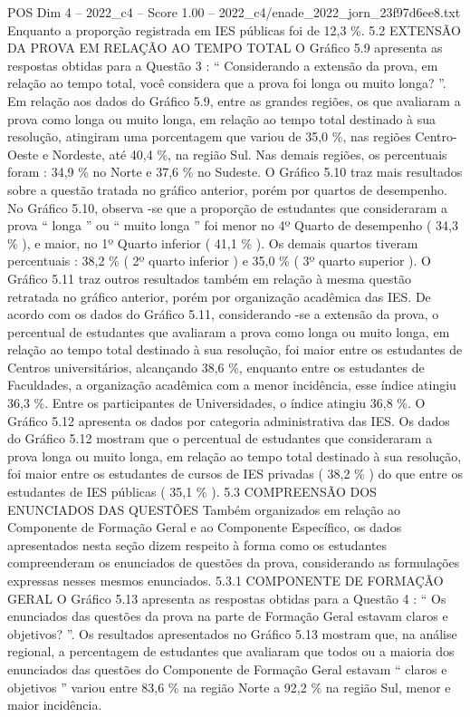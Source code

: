 \begin{textsample}{POS Dim 4 – 2022\_c4 – Score 1.00 – 2022\_c4/enade\_2022\_jorn\_23f97d6ee8.txt}
Enquanto a proporção registrada em IES públicas foi de 12,3 \%. 5.2 EXTENSÃO DA PROVA EM RELAÇÃO AO TEMPO TOTAL O Gráfico 5.9 apresenta as respostas obtidas para a Questão 3 : “ Considerando a extensão da prova, em relação ao tempo total, você considera que a prova foi longa ou muito longa? ”.
Em relação aos dados do Gráfico 5.9, entre as grandes regiões, os que avaliaram a prova como longa ou muito longa, em relação ao tempo total destinado à sua resolução, atingiram uma porcentagem que variou de 35,0 \%, nas regiões Centro-Oeste e Nordeste, até 40,4 \%, na região Sul.
Nas demais regiões, os percentuais foram : 34,9 \% no Norte e 37,6 \% no Sudeste.
O Gráfico 5.10 traz mais resultados sobre a questão tratada no gráfico anterior, porém por quartos de desempenho.
No Gráfico 5.10, observa -se que a proporção de estudantes que consideraram a prova “ longa ” ou “ muito longa ” foi menor no 4º Quarto de desempenho ( 34,3 \% ), e maior, no 1º Quarto inferior ( 41,1 \% ).
Os demais quartos tiveram percentuais : 38,2 \% ( 2º quarto inferior ) e 35,0 \% ( 3º quarto superior ).
O Gráfico 5.11 traz outros resultados também em relação à mesma questão retratada no gráfico anterior, porém por organização acadêmica das IES.
De acordo com os dados do Gráfico 5.11, considerando -se a extensão da prova, o percentual de estudantes que avaliaram a prova como longa ou muito longa, em relação ao tempo total destinado à sua resolução, foi maior entre os estudantes de Centros universitários, alcançando 38,6 \%, enquanto entre os estudantes de Faculdades, a organização acadêmica com a menor incidência, esse índice atingiu 36,3 \%.
Entre os participantes de Universidades, o índice atingiu 36,8 \%.
O Gráfico 5.12 apresenta os dados por categoria administrativa das IES.
Os dados do Gráfico 5.12 mostram que o percentual de estudantes que consideraram a prova longa ou muito longa, em relação ao tempo total destinado à sua resolução, foi maior entre os estudantes de cursos de IES privadas ( 38,2 \% ) do que entre os estudantes de IES públicas ( 35,1 \% ). 5.3 COMPREENSÃO DOS ENUNCIADOS DAS QUESTÕES Também organizados em relação ao Componente de Formação Geral e ao Componente Específico, os dados apresentados nesta seção dizem respeito à forma como os estudantes compreenderam os enunciados de questões da prova, considerando as formulações expressas nesses mesmos enunciados. 5.3.1 COMPONENTE DE FORMAÇÃO GERAL O Gráfico 5.13 apresenta as respostas obtidas para a Questão 4 : “ Os enunciados das questões da prova na parte de Formação Geral estavam claros e objetivos? ”.
Os resultados apresentados no Gráfico 5.13 mostram que, na análise regional, a percentagem de estudantes que avaliaram que todos ou a maioria dos enunciados das questões do Componente de Formação Geral estavam “ claros e objetivos ” variou entre 83,6 \% na região Norte a 92,2 \% na região Sul, menor e maior incidência.

\end{textsample}
